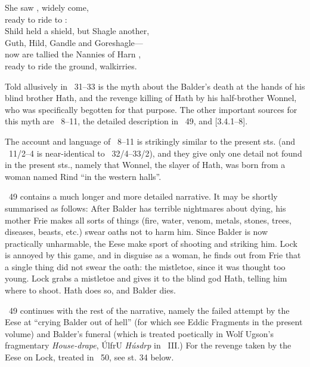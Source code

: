 \bvb She saw , widely come, \\
ready to ride to : \\
Shild held a shield, but Shagle another, \\
Guth, Hild, Gandle and Goreshagle— \\
now are tallied the Nannies of Harn , \\
ready to ride the ground, walkirries.\evb\evg

\sectionline

{\small Told allusively in \Voluspa\ 31–33 is the myth about the Balder’s death at the hands of his blind brother Hath, and the revenge killing of Hath by his half-brother Wonnel, who was specifically begotten for that purpose.  The other important sources for this myth are \Baldrsdraumar\ 8–11, the detailed description in \Gylfaginning\ 49, and \textcite{Saxo}[3.4.1–8].

The account and language of \Baldrsdraumar\ 8–11 is strikingly similar to the present sts. (and \Baldrsdraumar\ 11/2–4 is near-identical to \Voluspa\ 32/4–33/2), and they give only one detail not found in the present sts., namely that Wonnel, the slayer of Hath, was born from a woman named Rind “in the western halls”.

\Gylfaginning\ 49 contains a much longer and more detailed narrative.  It may be shortly summarised as follows: After Balder has terrible nightmares about dying, his mother Frie makes all sorts of things (fire, water, venom, metals, stones, trees, diseases, beasts, etc.) swear oaths not to harm him.  Since Balder is now practically unharmable, the Eese make sport of shooting and striking him.  Lock is annoyed by this game, and in disguise as a woman, he finds out from Frie that a single thing did not swear the oath: the mistletoe, since it was thought too young.  Lock grabs a mistletoe and gives it to the blind god Hath, telling him where to shoot.  Hath does so, and Balder dies.

\Gylfaginning\ 49 continues with the rest of the narrative, namely the failed attempt by the Eese at “crying Balder out of hell” (for which see Eddic Fragments in the present volume) and Balder’s funeral (which is treated poetically in Wolf Ugson’s fragmentary \emph{House-drape}, ÚlfrU \emph{Húsdrp} in \Skp\ III.)  For the revenge taken by the Eese on Lock, treated in \Gylfaginning\ 50, see st. 34 below.

}
